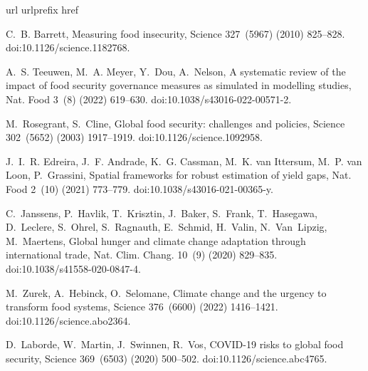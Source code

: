 \documentclass[preprint,3p,times,sort&compress]{elsarticle}
\begin{document}
\begin{thebibliography}{10}
\expandafter\ifx\csname url\endcsname\relax
  \def\url#1{\texttt{#1}}\fi
\expandafter\ifx\csname urlprefix\endcsname\relax\def\urlprefix{URL }\fi
\expandafter\ifx\csname href\endcsname\relax
  \def\href#1#2{#2} \def\path#1{#1}\fi

C.~B. Barrett, Measuring food insecurity, Science 327~(5967) (2010) 825--828.
\newblock \href {https://doi.org/10.1126/science.1182768}
  {\path{doi:10.1126/science.1182768}}.

A.~S. Teeuwen, M.~A. Meyer, Y.~Dou, A.~Nelson, A systematic review of the
  impact of food security governance measures as simulated in modelling
  studies, Nat. Food 3~(8) (2022) 619--630.
\newblock \href {https://doi.org/10.1038/s43016-022-00571-2}
  {\path{doi:10.1038/s43016-022-00571-2}}.

M.~Rosegrant, S.~Cline, Global food security: challenges and policies, Science
  302~(5652) (2003) 1917--1919.
\newblock \href {https://doi.org/10.1126/science.1092958}
  {\path{doi:10.1126/science.1092958}}.

J.~I.~R. Edreira, J.~F. Andrade, K.~G. Cassman, M.~K. van Ittersum, M.~P. van
  Loon, P.~Grassini, Spatial frameworks for robust estimation of yield gaps,
  Nat. Food 2~(10) (2021) 773--779.
\newblock \href {https://doi.org/10.1038/s43016-021-00365-y}
  {\path{doi:10.1038/s43016-021-00365-y}}.

C.~Janssens, P.~Havlik, T.~Krisztin, J.~Baker, S.~Frank, T.~Hasegawa,
  D.~Leclere, S.~Ohrel, S.~Ragnauth, E.~Schmid, H.~Valin, N.~Van~Lipzig,
  M.~Maertens, Global hunger and climate change adaptation through
  international trade, Nat. Clim. Chang. 10~(9) (2020) 829--835.
\newblock \href {https://doi.org/10.1038/s41558-020-0847-4}
  {\path{doi:10.1038/s41558-020-0847-4}}.

M.~Zurek, A.~Hebinck, O.~Selomane, Climate change and the urgency to transform
  food systems, Science 376~(6600) (2022) 1416--1421.
\newblock \href {https://doi.org/10.1126/science.abo2364}
  {\path{doi:10.1126/science.abo2364}}.

D.~Laborde, W.~Martin, J.~Swinnen, R.~Vos, {COVID}-19 risks to global food
  security, Science 369~(6503) (2020) 500--502.
\newblock \href {https://doi.org/10.1126/science.abc4765}
  {\path{doi:10.1126/science.abc4765}}.


\end{thebibliography}
\end{document}
